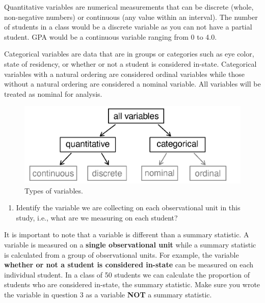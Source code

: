 \documentclass[
]{report}
\providecommand{\tightlist}{%
  \setlength{\itemsep}{0pt}\setlength{\parskip}{0pt}}
\begin{document}
Quantitative variables are numerical measurements that can be discrete (whole, non-negative numbers) or continuous (any value within an interval). The number of students in a class would be a discrete variable as you can not have a partial student. GPA would be a continuous variable ranging from 0 to 4.0.

Categorical variables are data that are in groups or categories such as eye color, state of residency, or whether or not a student is considered in-state. Categorical variables with a natural ordering are considered ordinal variables while those without a natural ordering are considered a nominal variable. All variables will be treated as nominal for analysis.

\begin{figure}

{\centering \includegraphics[width=0.75\linewidth]{images/variables} 

}

\caption{Types of variables.}\label{fig:unnamed-chunk-1}
\end{figure}

\begin{enumerate}
\def\labelenumi{\arabic{enumi}.}
\setcounter{enumi}{2}
\tightlist
\item
  Identify the variable we are collecting on each observational unit in this study, i.e., what are we measuring on each student?
\end{enumerate}

\vspace{.8in}

It is important to note that a variable is different than a summary statistic. A variable is measured on a \textbf{single observational unit} while a summary statistic is calculated from a group of observational units. For example, the variable \textbf{whether or not a student is considered in-state} can be measured on each individual student. In a class of 50 students we can calculate the proportion of students who are considered in-state, the summary statistic. Make sure you wrote the variable in question 3 as a variable \textbf{NOT} a summary statistic.
\end{document}

